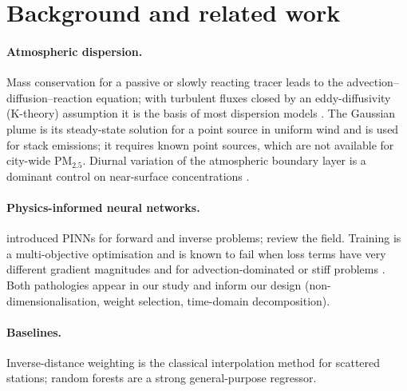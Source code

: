 \documentclass[11pt,a4paper]{article}
\newcommand{\PMtwo}{PM$_{2.5}$}
\begin{document}
\section{Background and related work}
\paragraph{Atmospheric dispersion.} Mass conservation for a passive or slowly reacting tracer leads to
the advection--diffusion--reaction equation; with turbulent fluxes closed by an eddy-diffusivity (K-theory)
assumption it is the basis of most dispersion models \citep{seinfeld2016,stockie2011}. The Gaussian
plume is its steady-state solution for a point source in uniform wind and is used for stack emissions;
it requires known point sources, which are not available for city-wide \PMtwo. Diurnal variation of the
atmospheric boundary layer is a dominant control on near-surface concentrations \citep{stull1988}.

\paragraph{Physics-informed neural networks.} \citet{raissi2019} introduced PINNs for forward and inverse
problems; \citet{karniadakis2021} review the field. Training is a multi-objective optimisation and is known to
fail when loss terms have very different gradient magnitudes \citep{wang2021} and for advection-dominated or
stiff problems \citep{krishnapriyan2021}. Both pathologies appear in our study and inform our design
(non-dimensionalisation, weight selection, time-domain decomposition).

\paragraph{Baselines.} Inverse-distance weighting \citep{shepard1968} is the classical interpolation method
for scattered stations; random forests \citep{breiman2001} are a strong general-purpose regressor.

\end{document}
